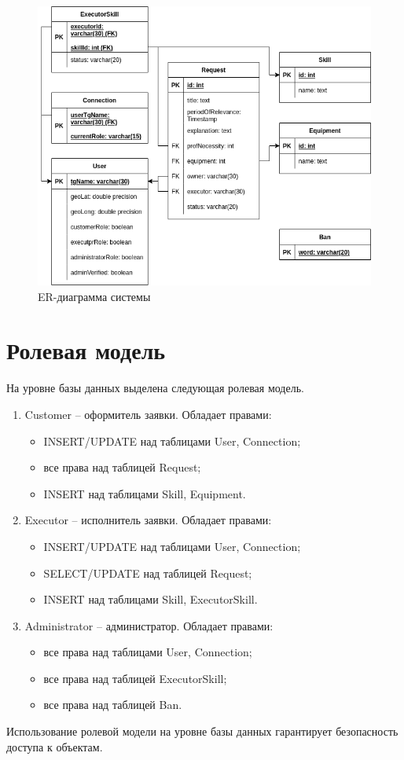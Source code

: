\begin{figure}[H]
	\begin{center}
		\includegraphics[scale=0.68]{assets/er.png}
	\end{center}
	\caption{ER-диаграмма системы}
	\label{er}
\end{figure}

\section{Ролевая модель}

На уровне базы данных выделена следующая ролевая модель.
\begin{enumerate}
	\item Customer -- оформитель заявки. Обладает правами:
	\begin{itemize}
		\item INSERT/UPDATE над таблицами User, Connection;
		\item все права над таблицей Request;
		\item INSERT над таблицами Skill, Equipment.
	\end{itemize}
	\item Executor -- исполнитель заявки. Обладает правами:
	\begin{itemize}
		\item INSERT/UPDATE над таблицами User, Connection;
		\item SELECT/UPDATE над таблицей Request;
		\item INSERT над таблицами Skill, ExecutorSkill.
	\end{itemize}
	\item Administrator -- администратор. Обладает правами:
	\begin{itemize}
		\item все права над таблицами User, Connection;
		\item все права над таблицей ExecutorSkill;
		\item все права над таблицей Ban.
	\end{itemize}
\end{enumerate}
Использование ролевой модели на уровне базы данных гарантирует безопасность доступа к объектам.

